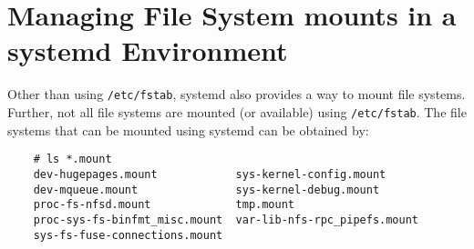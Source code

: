 
\usepackage{minted}
\usepackage{booktabs}


	
	
	\section{Managing File System mounts in a systemd Environment}
	Other than using \verb|/etc/fstab|, systemd also provides a way to mount file systems. Further, not all file systems are mounted (or available) using \verb|/etc/fstab|. The file systems that can be mounted using systemd can be obtained by:
	
	\vspace{-15pt}
	\begin{verbatim}
	# ls *.mount
	dev-hugepages.mount            sys-kernel-config.mount
	dev-mqueue.mount               sys-kernel-debug.mount
	proc-fs-nfsd.mount             tmp.mount
	proc-sys-fs-binfmt_misc.mount  var-lib-nfs-rpc_pipefs.mount
	sys-fs-fuse-connections.mount
	\end{verbatim}
	\vspace{-10pt}
	
	
		 




